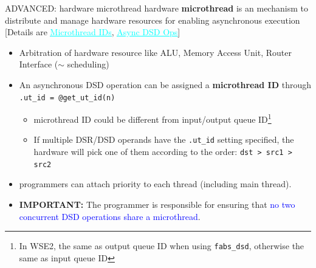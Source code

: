 \documentclass[dvipdfmx, 11pt, aspectratio=169]{beamer}   %
\newcommand{\ulhref}[2]{\href{#1}{\textcolor{cyan}{\uline{#2}}}}
\begin{document}
\begin{frame}[fragile]{ADVANCED: hardware microthread}
hardware \textbf{microthread} is an mechanism to distribute and manage hardware resources for enabling asynchronous execution
[Details are \ulhref{https://sdk.cerebras.net/csl/language/microthreads_wse3}{Microthread IDs}, \ulhref{https://sdk.cerebras.net/csl/language/dsds\#language-dsds-async}{Async DSD Ops}]
\vspace{-0.3\baselineskip}
\begin{itemize}
    \item Arbitration of hardware resource like ALU, Memory Access Unit, Router Interface ($\sim$ scheduling) 
    \item An asynchronous DSD operation can be assigned a \textbf{microthread ID} through \lstinline|.ut_id = @get_ut_id(n)|
    \begin{itemize}
        \item microthread ID could be different from input/output queue ID\footnote{In WSE2, the same as output queue ID when using \lstinline|fabs_dsd|, otherwise the same as input queue ID}
        \item If multiple DSR/DSD operands have the \lstinline|.ut_id| setting specified, the hardware will pick one of them according to the order: \lstinline|dst > src1 > src2|
    \end{itemize}
    \item programmers can attach priority to each thread (including main thread). 
    \item \textbf{IMPORTANT: } The programmer is responsible for ensuring that \textcolor{blue}{no two concurrent DSD operations share a microthread}.
\end{itemize}
\end{frame}
\end{document}
